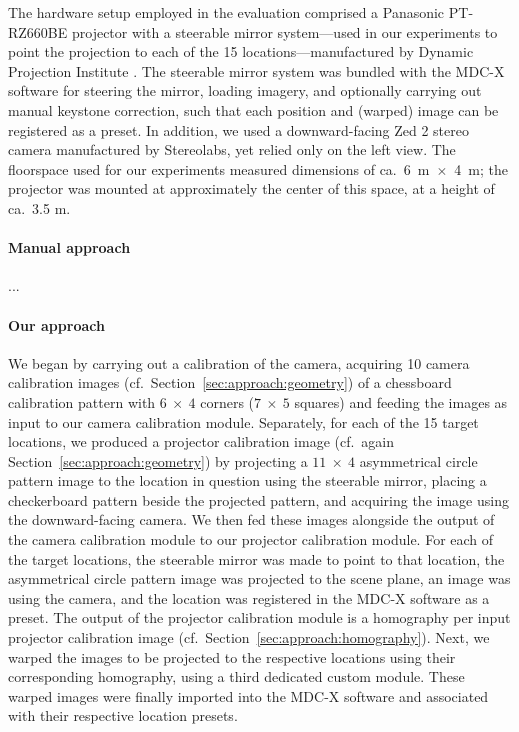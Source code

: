 \documentclass[review]{elsarticle}
\begin{document}
{The hardware setup employed in the evaluation comprised a Panasonic PT-RZ660BE projector with a steerable mirror system---used in our experiments to point the projection to each of the 15 locations---manufactured by Dynamic Projection Institute \cite{rupprecht2020information,Rupprecht2021}. The steerable mirror system was bundled with the MDC-X software for steering the mirror, loading imagery, and optionally carrying out manual keystone correction, such that each position and (warped) image can be registered as a preset. In addition, we used a downward-facing Zed 2 stereo camera manufactured by Stereolabs, yet relied only on the left view. The floorspace used for our experiments measured dimensions of ca.\ 6~m~$\times$~4~m; the projector was mounted at approximately the center of this space, at a height of ca.\ 3.5 m.

\paragraph{Manual approach} ...

\paragraph{Our approach} We began by carrying out a calibration of the camera, acquiring 10 camera calibration images (cf.\ Section~\ref{sec:approach:geometry}) of a chessboard calibration pattern with $6~\times~4$ corners ($7~\times~5$ squares) and feeding the images as input to our camera calibration module. Separately, for each of the 15 target locations, we produced a projector calibration image (cf.\ again Section~\ref{sec:approach:geometry}) by projecting a $11~\times~4$ asymmetrical circle pattern image to the location in question using the steerable mirror, placing a checkerboard pattern beside the projected pattern, and acquiring the image using the downward-facing camera. We then fed these images alongside the output of the camera calibration module to our projector calibration module. For each of the target locations, the steerable mirror was made to point to that location, the asymmetrical circle pattern image was projected to the scene plane, an image was using the camera, and the location was registered in the MDC-X software as a preset. The output of the projector calibration module is a homography per input projector calibration image (cf.\ Section~\ref{sec:approach:homography}). Next, we warped the images to be projected to the respective locations using their corresponding homography, using a third dedicated custom module. These warped images were finally imported into the MDC-X software and associated with their respective location presets.

}
\end{document}
